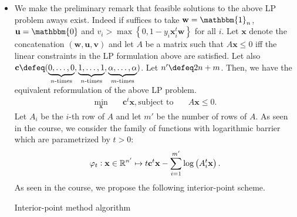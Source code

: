 \documentclass{article}
\begin{document}
\begin{itemize}
       \item We make the preliminary remark that
           feasible solutions to the above LP
           problem aways exist. Indeed
           if suffices to take $\mathbf{w} = \mathbbm{1}_{n}$,
           $\mathbf{u} = \mathbbm{0}$ and
           $v_{i} > \max\left\{0, 1 - y_{i}\mathbf{x}_{i}^{t}\mathbf{w}\right\}$ 
           for all $i$.
           Let $\mathbf{x}$ denote the concatenation
           $\left(\mathbf{w}, \mathbf{u}, \mathbf{v}\right)$ and 
           let $A$ be a matrix such that $A\mathbf{x} \leq 0$
           iff the linear constraints in the LP formulation
           above are satisfied. Let also
           $\mathbf{c} \defeq (
           \underbrace{0, \ldots, 0}_{\text{$n$-times}},
           \underbrace{1, \ldots, 1}_{\text{$n$-times}},
           \underbrace{\alpha, \ldots, \alpha}_{\text{$m$-times}})$.
           Let $n' \defeq 2n + m$. Then,
           we have the equivalent reformulation
           of the above LP problem.
           \begin{align*}
               \min_{\mathbf{x}} \quad & \mathbf{c}^{t}\mathbf{x},
               \text{subject to} \quad & A \mathbf{x} \leq 0. 
           \end{align*}
           Let $A_{i}$ be the $i$-th row of
           $A$ and let $m'$ be the number of
           rows of $A$.
           As seen in the course, we consider
           the family of functions with
           logarithmic barrier which 
           are parametrized by $t > 0$:
           \begin{equation*}
               \varphi_{t} \vcentcolon \mathbf{x} \in \mathbb{R}^{n'}
               \mapsto t \mathbf{c}^{t}\mathbf{x}
               - \sum_{i = 1}^{m'} \log \left(A_{i}^{t}\mathbf{x}\right).
           \end{equation*}
           As seen in the course, we propose
           the following interior-point scheme.
           \begin{algorithm}
               \caption{Interior-point method algorithm}
               

           \end{algorithm}
           

\end{itemize}
\end{document}
